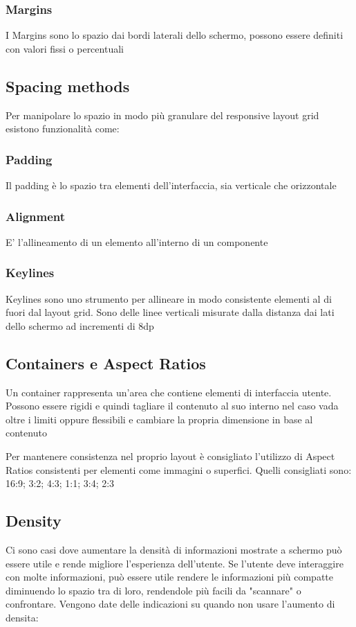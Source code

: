 \documentclass[12pt, a4paper]{report}
\begin{document}
		\subsubsection{Margins}
		I Margins sono lo spazio dai bordi laterali dello schermo, possono essere definiti con valori fissi o percentuali
	\subsection{Spacing methods}
		Per manipolare lo spazio in modo più granulare del responsive layout grid esistono funzionalità come:
		\subsubsection{Padding}
		  Il padding è lo spazio tra elementi dell'interfaccia, sia verticale che orizzontale
		\subsubsection{Alignment}
		 E' l'allineamento di un elemento all'interno di un componente
		 \subsubsection{Keylines}
		  Keylines sono uno strumento per allineare in modo consistente elementi al di fuori dal layout grid. Sono delle linee verticali misurate dalla distanza dai lati dello schermo ad incrementi di 8dp\cite{layout_spacing}
	\subsection{Containers e Aspect Ratios}
		  Un container rappresenta un'area che contiene elementi di interfaccia utente.
		  Possono essere rigidi e quindi tagliare il contenuto al suo interno nel caso vada oltre i limiti oppure flessibili e cambiare la propria dimensione in base al contenuto
		  
		  Per mantenere consistenza nel proprio layout è consigliato l'utilizzo di Aspect Ratios consistenti per elementi come immagini o superfici. Quelli consigliati sono: 16:9; 3:2; 4:3; 1:1; 3:4; 2:3\cite{layout_containers}
	\subsection{Density}
		  Ci sono casi dove aumentare la densità di informazioni mostrate a schermo può essere utile e rende migliore l'esperienza dell'utente.
		  Se l'utente deve interaggire con molte informazioni, può essere utile rendere le informazioni più compatte diminuendo lo spazio tra di loro, rendendole più facili da "scannare" o confrontare.
		  Vengono date delle indicazioni \cite{layout_density}su quando non usare l'aumento di densita:
\end{document}
